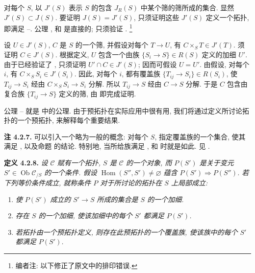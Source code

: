 对每个 \(S\), 以 \(J'(S)\) 表示 \(S\) 的包含 \(J_R(S)\)
中某个筛的筛所成的集合. 显然 \(J'(S)\subset J(S)\).
要证明 \(J(S)=J'(S)\), 只须证明这些 \(J'(S)\) 定义一个拓扑,
即满足 --.
公理 ,
 和
 是直接的;
只须验证 .
\footnote{编者注: 以下修正了原文中的排印错误.}

设 \(U\in J'(S)\), \(C\) 是 \(S\) 的一个筛,
并假设对每个 \(T\to U\), 有 \(C\times_ST\in J'(T)\).
须证明 \(C\in J'(S)\). 根据定义, \(U\) 包含一个由族
\(\{S_i\to S\}\in R(S)\) 定义的加细 \(U'\).
由于已经验证了 ,
只须证明 \(U'\cap C\in J'(S)\); 因而可假设 \(U=U'\).
由假设, 对每个 \(i\), 有 \(C\times_SS_i\in J'(S_i)\).
因此, 对每个 \(i\), 都有覆盖族 \(\{T_{ij}\to S_i\}\in R(S_i)\),
使 \(T_{ij}\to S_i\) 经由 \(C\times_SS_i\to S_i\) 分解.
所以 \(T_{ij}\to S\) 经由 \(C\to S\) 分解.
于是 \(C\) 包含由复合族 \(\{T_{ij}\to S\}\) 定义的筛,
由  即完成证明.

公理 --
就是  中的公理.
由于预拓扑在实际应用中很有用, 我们将通过定义所讨论拓扑的一个预拓扑,
来解释每个重要结果.

\medskip
\noindent{}\textbf{注 4.2.7.}
可以引入一个略为一般的概念:
对每个 \(S\), 指定覆盖族的一个集合, 使其满足
,
以及命题  的结论.
特别地, 当所给族满足
,
 和
 时就是如此.
见 .

\medskip
\noindent{}\textbf{定义 4.2.8.}
\textit{设 \(\mathscr C\) 赋有一个拓扑, \(S\) 是 \(\mathscr C\) 的一个对象,
而 \(P(S')\) 是关于变元 \(S'\in\operatorname{Ob}\mathscr C_{/S}\) 的一个条件.
假设 \(\operatorname{Hom}(S'',S')\ne\varnothing\) 蕴含
\(P(S')\Rightarrow P(S'')\).
若下列等价条件成立, 就称条件 \(P\) 对于所讨论的拓扑\emph{在 \(S\) 上局部成立}:}
\begin{enumerate}
 \item[(i)] \textit{使 \(P(S')\)
 成立的 \(S'\to S\) 所成的集合是 \(S\) 的一个加细.}
 \item[(ii)] \textit{存在
 \(S\) 的一个加细, 使该加细中的每个 \(S'\) 都满足 \(P(S')\).}
 \item[(iii)] \textit{若拓扑由一个预拓扑定义,
 则存在此预拓扑的一个覆盖族, 使该族中的每个 \(S'\) 都满足 \(P(S')\).}
\end{enumerate}


